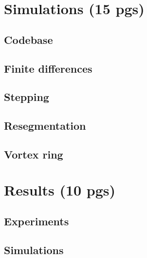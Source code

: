 \documentclass[a4paper, 12pt]{report}
\newcommand{\<}{\langle} %
\renewcommand{\>}{\rangle} %
\begin{document}
\newpage

\chapter{Simulations (15 pgs)}

\section{Codebase}

\section{Finite differences}

\section{Stepping}

\section{Resegmentation}

\section{Vortex ring}

\newpage

\chapter{Results (10 pgs)}

\section{Experiments}

\section{Simulations}

\newpage


\end{document}
